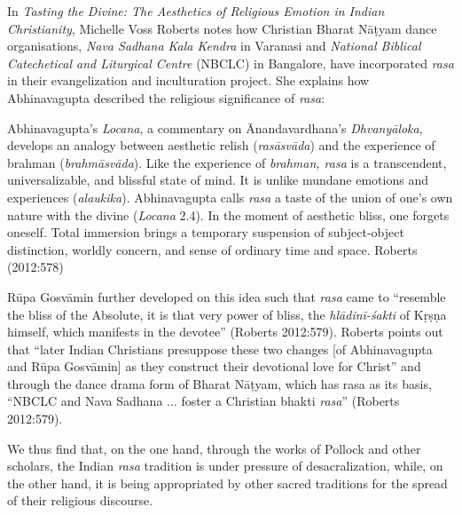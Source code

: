 In \textsl{Tasting the Divine: The Aesthetics of Religious Emotion in Indian Christianity}, Michelle Voss Roberts notes how Christian Bharat Nāṭyam dance organisations, \textsl{Nava Sadhana Kala Kendra} in Varanasi and \textsl{National Biblical Catechetical and Liturgical Centre} (NBCLC) in Bangalore, have incorporated \textsl{rasa} in their evangelization and inculturation project. She explains how Abhinavagupta described the religious significance of \textsl{rasa}:

\begin{myquote}
Abhinavagupta's \textsl{Locana}, a commentary on Ānandavardhana's \textsl{Dhvanyāloka}, develops an analogy between aesthetic relish (\textsl{rasāsvāda}) and the experience of brahman (\textsl{brahmāsvāda}). Like the experience of \textsl{brahman, rasa} is a transcendent, universalizable, and blissful state of mind. It is unlike mundane emotions and experiences (\textsl{alaukika}). Abhinavagupta calls \textsl{rasa} a taste of the union of one's own nature with the divine (\textsl{Locana} 2.4). In the moment of aesthetic bliss, one forgets oneself. Total immersion brings a temporary suspension of subject-object distinction, worldly concern, and sense of ordinary time and space. 
\hfill Roberts (2012:578)
\end{myquote}

Rūpa Gosvāmin further developed on this idea such that \textsl{rasa} came to ``resemble the bliss of the Absolute, it is that very power of bliss, the \textsl{hlādinī-śakti} of Kṛṣṇa himself, which manifests in the devotee'' (Roberts 2012:579). Roberts points out that ``later Indian Christians presuppose these two changes [of Abhinavagupta and Rūpa Gosvāmin] as they construct their devotional love for Christ'' and through the dance drama form of Bharat Nāṭyam, which has rasa as its basis, ``NBCLC and Nava Sadhana ... foster a Christian bhakti \textsl{rasa}'' (Roberts 2012:579). 

We thus find that, on the one hand, through the works of Pollock and other scholars, the Indian \textsl{rasa} tradition is under pressure of desacralization, while, on the other hand, it is being appropriated by other sacred traditions for the spread of their religious discourse.

